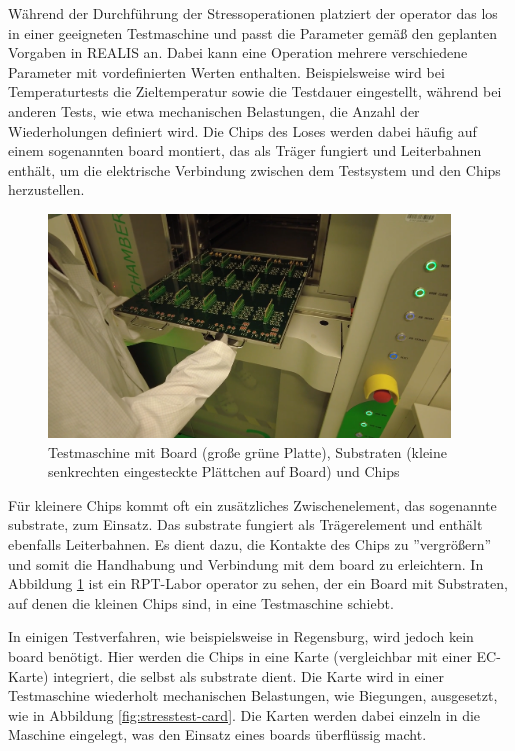 Während der Durchführung der Stressoperationen platziert der \gls{operator} das \gls{los} in einer geeigneten Testmaschine und passt die Parameter gemäß den geplanten Vorgaben in \gls{REALIS} an. Dabei kann eine Operation mehrere verschiedene Parameter mit vordefinierten Werten enthalten. Beispielsweise wird bei Temperaturtests die Zieltemperatur sowie die Testdauer eingestellt, während bei anderen Tests, wie etwa mechanischen Belastungen, die Anzahl der Wiederholungen definiert wird. Die Chips des Loses werden dabei häufig auf einem sogenannten \gls{board} montiert, das als Träger fungiert und Leiterbahnen enthält, um die elektrische Verbindung zwischen dem Testsystem und den Chips herzustellen.

\begin{figure}[!htbp]
    \centering
    \includegraphics[width=0.95\textwidth]{bilder/testmaschine-with-board-substrate.png}
    \caption{Testmaschine mit Board (große grüne Platte), Substraten (kleine senkrechten eingesteckte Plättchen auf Board) und Chips \cite{RPTLaborIntern}}
    \label{fig:testmachine-with-board-substrate}
\end{figure}

Für kleinere Chips kommt oft ein zusätzliches Zwischenelement, das sogenannte \gls{substrate}, zum Einsatz. Das \gls{substrate} fungiert als Trägerelement und enthält ebenfalls Leiterbahnen. Es dient dazu, die Kontakte des Chips zu ''vergrößern'' und somit die Handhabung und Verbindung mit dem \gls{board} zu erleichtern.
In Abbildung \ref{fig:testmachine-with-board-substrate} ist ein \gls{RPT}-Labor \gls{operator} zu sehen, der ein Board mit Substraten, auf denen die kleinen Chips sind, in eine Testmaschine schiebt.


In einigen Testverfahren, wie beispielsweise in Regensburg, wird jedoch kein \gls{board} benötigt. Hier werden die Chips in eine Karte (vergleichbar mit einer EC-Karte) integriert, die selbst als \gls{substrate} dient. Die Karte wird in einer Testmaschine wiederholt mechanischen Belastungen, wie Biegungen, ausgesetzt, wie in Abbildung \ref{fig:stresstest-card}. Die Karten werden dabei einzeln in die Maschine eingelegt, was den Einsatz eines \glspl{board} überflüssig macht.

